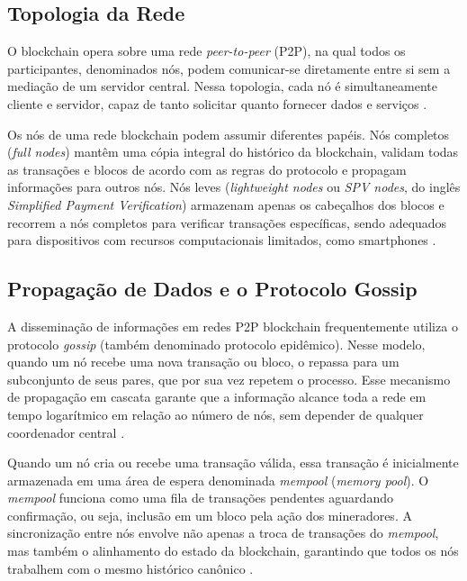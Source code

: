 \documentclass[12pt,a4paper]{report}
\begin{document}
\subsection{Topologia da Rede}

O blockchain opera sobre uma rede \textit{peer-to-peer} (P2P), na qual todos os participantes, denominados nós, podem comunicar-se diretamente entre si sem a mediação de um servidor central. Nessa topologia, cada nó é simultaneamente cliente e servidor, capaz de tanto solicitar quanto fornecer dados e serviços \cite{Bashir2023}.

Os nós de uma rede blockchain podem assumir diferentes papéis. Nós completos (\textit{full nodes}) mantêm uma cópia integral do histórico da blockchain, validam todas as transações e blocos de acordo com as regras do protocolo e propagam informações para outros nós. Nós leves (\textit{lightweight nodes} ou \textit{SPV nodes}, do inglês \textit{Simplified Payment Verification}) armazenam apenas os cabeçalhos dos blocos e recorrem a nós completos para verificar transações específicas, sendo adequados para dispositivos com recursos computacionais limitados, como smartphones \cite{Bashir2023}.

\subsection{Propagação de Dados e o Protocolo Gossip}

A disseminação de informações em redes P2P blockchain frequentemente utiliza o protocolo \textit{gossip} (também denominado protocolo epidêmico). Nesse modelo, quando um nó recebe uma nova transação ou bloco, o repassa para um subconjunto de seus pares, que por sua vez repetem o processo. Esse mecanismo de propagação em cascata garante que a informação alcance toda a rede em tempo logarítmico em relação ao número de nós, sem depender de qualquer coordenador central \cite{Bashir2023}.

Quando um nó cria ou recebe uma transação válida, essa transação é inicialmente armazenada em uma área de espera denominada \textit{mempool} (\textit{memory pool}). O \textit{mempool} funciona como uma fila de transações pendentes aguardando confirmação, ou seja, inclusão em um bloco pela ação dos mineradores. A sincronização entre nós envolve não apenas a troca de transações do \textit{mempool}, mas também o alinhamento do estado da blockchain, garantindo que todos os nós trabalhem com o mesmo histórico canônico \cite{Bashir2023}.
\end{document}

